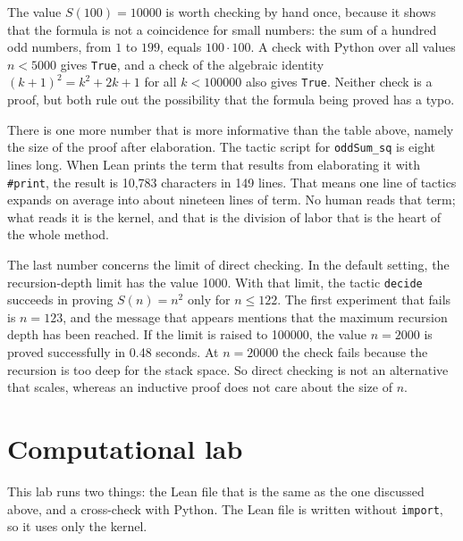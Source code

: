 The value $S(100)=10000$ is worth checking by hand once, because it shows that the formula is not a
coincidence for small numbers: the sum of a hundred odd numbers, from $1$ to $199$, equals
$100\cdot 100$. A check with Python over all values $n<5000$ gives \texttt{True}, and a check of the
algebraic identity $(k+1)^{2}=k^{2}+2k+1$ for all $k<100000$ also gives \texttt{True}. Neither check
is a proof, but both rule out the possibility that the formula being proved has a typo.

There is one more number that is more informative than the table above, namely the size of the proof
after elaboration. The tactic script for \texttt{oddSum\_sq} is eight lines long. When Lean prints
the term that results from elaborating it with \texttt{\#print}, the result is 10,783 characters in
149 lines. That means one line of tactics expands on average into about nineteen lines of term. No
human reads that term; what reads it is the kernel, and that is the division of labor that is the
heart of the whole method.

The last number concerns the limit of direct checking. In the default setting, the recursion-depth
limit has the value 1000. With that limit, the tactic \texttt{decide} succeeds in proving
$S(n)=n^{2}$ only for $n\le 122$. The first experiment that fails is $n=123$, and the message that
appears mentions that the maximum recursion depth has been reached. If the limit is raised to 100000,
the value $n=2000$ is proved successfully in 0.48 seconds. At $n=20000$ the check fails because the
recursion is too deep for the stack space. So direct checking is not an alternative that scales,
whereas an inductive proof does not care about the size of $n$.

\section{Computational lab}


This lab runs two things: the Lean file that is the same as the one discussed above, and a
cross-check with Python. The Lean file is written without \texttt{import}, so it uses only the
kernel.

